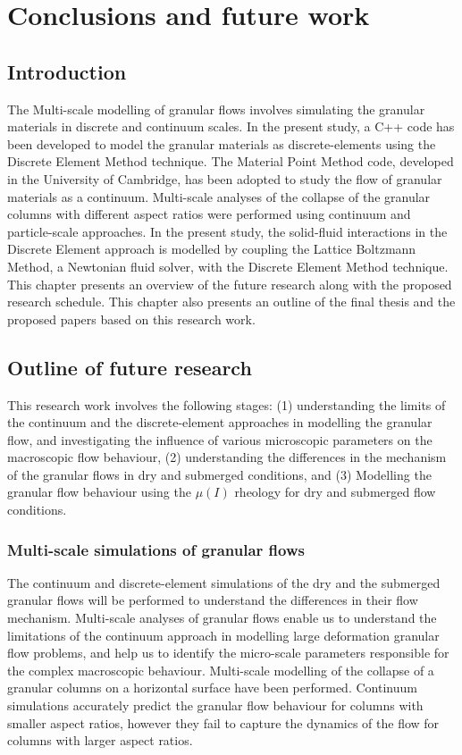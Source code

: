 \chapter{Conclusions and future work}

\ifpdf
    \graphicspath{{Chapter7/figs/raster/}{Chapter7/figs/pdf/}{Chapter7/figs/}}
\else
    \graphicspath{{Chapter7/figs/vector/}{Chapter7/figs/}}
\fi
\section{Introduction}
The Multi-scale modelling of granular flows involves simulating the granular 
materials in discrete and continuum scales. In the present study, a C++ code 
has been developed to model the granular materials as discrete-elements using 
the Discrete Element Method technique. The Material Point Method code, 
developed in 
the University of Cambridge, has been adopted to study the flow of granular 
materials as a continuum. Multi-scale analyses 
of the collapse of the granular columns with different aspect ratios were 
performed using continuum and particle-scale approaches. In the present study, 
the solid-fluid interactions in the Discrete Element approach is modelled by 
coupling the Lattice Boltzmann Method, a Newtonian fluid solver, with the 
Discrete Element Method technique. This chapter presents an overview of the 
future 
research along with the proposed research schedule. This chapter also presents 
an outline of the final thesis and the proposed papers based on this research 
work. 


\section{Outline of future research}
This research work involves the following stages: (1) understanding the limits 
of the continuum and the discrete-element approaches in modelling the granular 
flow, and investigating the influence of various microscopic parameters on the 
macroscopic flow behaviour, (2) understanding the differences in the mechanism 
of the granular flows in dry and submerged conditions, and (3) Modelling the 
granular flow behaviour using the $\mu(I)$ rheology for dry and submerged flow 
conditions.

\subsection{Multi-scale simulations of granular flows}
The continuum and discrete-element simulations of the dry and the submerged 
granular flows will be performed to understand the differences in their flow 
mechanism. Multi-scale analyses of granular flows enable us to understand the 
limitations of the continuum approach in modelling large deformation granular 
flow problems, and help us to identify the micro-scale parameters responsible 
for the complex macroscopic behaviour. Multi-scale modelling of the collapse of 
a granular columns on a horizontal surface have been performed. Continuum 
simulations accurately predict the granular flow behaviour for columns with 
smaller aspect ratios, however they fail to capture the dynamics of the flow 
for columns with larger aspect ratios. 


